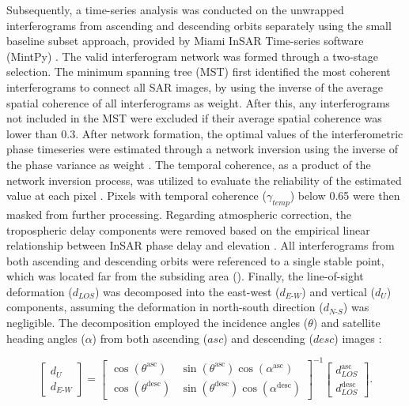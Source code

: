 Subsequently, a time-series analysis was conducted on the unwrapped interferograms from ascending and descending orbits separately using the small baseline subset approach, provided by Miami InSAR Time-series software (MintPy) \citep{mintpy_yunjun}. The valid interferogram network was formed through a two-stage selection. The minimum spanning tree (MST) \citep{mst_perissin} first identified the most coherent interferograms to connect all SAR images, by using the inverse of the average spatial coherence of all interferograms as weight. After this, any interferograms not included in the MST were excluded if their average spatial coherence was lower than $\text{0.3}$. After network formation, the optimal values of the interferometric phase timeseries were estimated through a network inversion using the inverse of the phase variance as weight \citep{networkinverse_var}. The temporal coherence, as a product of the network inversion process, was utilized to evaluate the reliability of the estimated value at each pixel \citep{temporal_coherence}. Pixels with temporal coherence ($\gamma_\textit{temp}$) below 0.65 were then masked from further processing. Regarding atmospheric correction, the tropospheric delay components were removed based on the empirical linear relationship between InSAR phase delay and elevation \citep{height_correlation}. All interferograms from both ascending and descending orbits were referenced to a single stable point, which was located far from the subsiding area (). Finally, the line-of-sight deformation (${d_\textit{LOS}}$) was decomposed into the east-west (${d_\textit{E-W}}$) and vertical (${d_\textit{U}}$) components, assuming the deformation in north-south direction (${d_\textit{N-S}}$) was negligible. The decomposition employed the incidence angles ($\theta$) and satellite heading angles ($\alpha$) from both ascending ($\textit{asc}$) and descending ($\textit{desc}$) images \citep{hanssen_book}:

\begin{equation}
	\begin{bmatrix}
		d_{\textit{U}} \\
		d_{\textit{E-W}}
	\end{bmatrix}
	=
	\begin{bmatrix}
		\cos(\theta^{\text{asc}}) & \sin(\theta^{\text{asc}}) \cos(\alpha^{\text{asc}}) \\
		\cos(\theta^{\text{desc}}) & \sin(\theta^{\text{desc}}) \cos(\alpha^{\text{desc}})
	\end{bmatrix}^{-1}
	\begin{bmatrix}
		d_{\textit{LOS}}^{\text{asc}} \\
		d_{\textit{LOS}}^{\text{desc}}
	\end{bmatrix}.
	\label{eq:decomposition} %
\end{equation}


